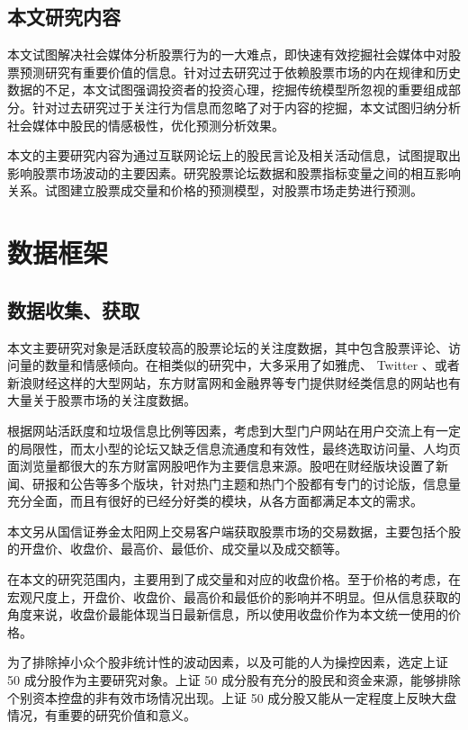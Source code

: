 \section{本文研究内容}

本文试图解决社会媒体分析股票行为的一大难点，即快速有效挖掘社会媒体中对股票预测研究有重要价值的信息。针对过去研究过于依赖股票市场的内在规律和历史数据的不足，本文试图强调投资者的投资心理，挖掘传统模型所忽视的重要组成部分。针对过去研究过于关注行为信息而忽略了对于内容的挖掘，本文试图归纳分析社会媒体中股民的情感极性，优化预测分析效果。

本文的主要研究内容为通过互联网论坛上的股民言论及相关活动信息，试图提取出影响股票市场波动的主要因素。研究股票论坛数据和股票指标变量之间的相互影响关系。试图建立股票成交量和价格的预测模型，对股票市场走势进行预测。

\chapter{数据框架}

\section{数据收集、获取}

本文主要研究对象是活跃度较高的股票论坛的关注度数据，其中包含股票评论、访问量的数量和情感倾向。在相类似的研究中，大多采用了如雅虎、 Twitter 、或者新浪财经这样的大型网站，东方财富网和金融界等专门提供财经类信息的网站也有大量关于股票市场的关注度数据。

根据网站活跃度和垃圾信息比例等因素，考虑到大型门户网站在用户交流上有一定的局限性，而太小型的论坛又缺乏信息流通度和有效性，最终选取访问量、人均页面浏览量都很大的东方财富网股吧作为主要信息来源。股吧在财经版块设置了新闻、研报和公告等多个版块，针对热门主题和热门个股都有专门的讨论版，信息量充分全面，而且有很好的已经分好类的模块，从各方面都满足本文的需求。

本文另从国信证券金太阳网上交易客户端获取股票市场的交易数据，主要包括个股的开盘价、收盘价、最高价、最低价、成交量以及成交额等。

在本文的研究范围内，主要用到了成交量和对应的收盘价格。至于价格的考虑，在宏观尺度上，开盘价、收盘价、最高价和最低价的影响并不明显。但从信息获取的角度来说，收盘价最能体现当日最新信息，所以使用收盘价作为本文统一使用的价格。

为了排除掉小众个股非统计性的波动因素，以及可能的人为操控因素，选定上证 50 成分股作为主要研究对象。上证 50 成分股有充分的股民和资金来源，能够排除个别资本控盘的非有效市场情况出现。上证 50 成分股又能从一定程度上反映大盘情况，有重要的研究价值和意义。

